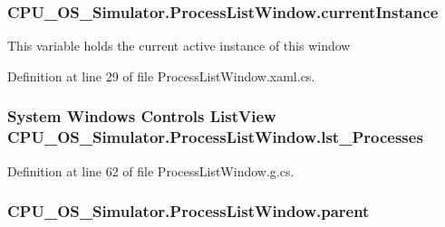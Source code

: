 \subsubsection[{current\+Instance}]{ C\+P\+U\+\_\+\+O\+S\+\_\+\+Simulator.\+Process\+List\+Window.\+current\+Instance\hspace{0.3cm}{\ttfamily [static]}}\label{class_c_p_u___o_s___simulator_1_1_process_list_window_a102d7796240201b548db10f1d129d9d0}


This variable holds the current active instance of this window 



Definition at line 29 of file Process\+List\+Window.\+xaml.\+cs.

\hypertarget{class_c_p_u___o_s___simulator_1_1_process_list_window_a74ca7787bf825406ce05b71e357e29ed}{}
\subsubsection[{lst\+\_\+\+Processes}]{\setlength{\rightskip}{0pt plus 5cm}System Windows Controls List\+View C\+P\+U\+\_\+\+O\+S\+\_\+\+Simulator.\+Process\+List\+Window.\+lst\+\_\+\+Processes\hspace{0.3cm}{\ttfamily [package]}}\label{class_c_p_u___o_s___simulator_1_1_process_list_window_a74ca7787bf825406ce05b71e357e29ed}


Definition at line 62 of file Process\+List\+Window.\+g.\+cs.

\hypertarget{class_c_p_u___o_s___simulator_1_1_process_list_window_a51c931e0cfe4899c538507d0a999d267}{}
\subsubsection[{parent}]{ C\+P\+U\+\_\+\+O\+S\+\_\+\+Simulator.\+Process\+List\+Window.\+parent\hspace{0.3cm}{\ttfamily [private]}}\label{class_c_p_u___o_s___simulator_1_1_process_list_window_a51c931e0cfe4899c538507d0a999d267}


